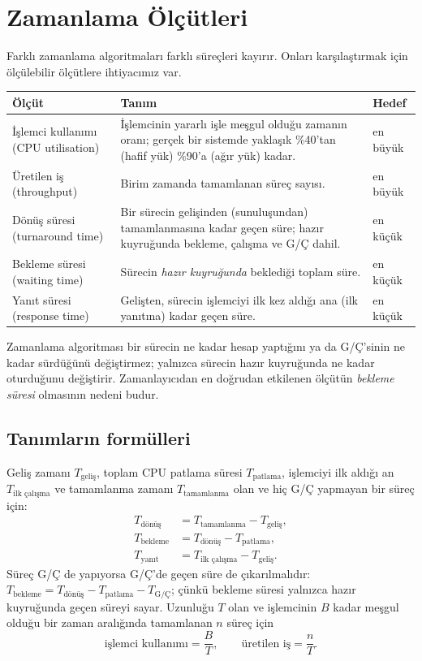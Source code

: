 \documentclass[11pt,a4paper]{article}
\begin{document}
\section{Zamanlama Ölçütleri}

Farklı zamanlama algoritmaları farklı süreçleri kayırır. Onları karşılaştırmak için ölçülebilir ölçütlere ihtiyacımız var.

\begin{center}
\renewcommand{\arraystretch}{1.3}
\begin{tabularx}{\linewidth}{>{\raggedright\arraybackslash}p{3.3cm} X l}
\toprule
\textbf{Ölçüt} & \textbf{Tanım} & \textbf{Hedef} \\
\midrule
İşlemci kullanımı (CPU utilisation) & İşlemcinin yararlı işle meşgul olduğu zamanın oranı; gerçek bir sistemde yaklaşık \%40'tan (hafif yük) \%90'a (ağır yük) kadar. & en büyük \\
Üretilen iş (throughput) & Birim zamanda tamamlanan süreç sayısı. & en büyük \\
Dönüş süresi (turnaround time) & Bir sürecin gelişinden (sunuluşundan) tamamlanmasına kadar geçen süre; hazır kuyruğunda bekleme, çalışma ve G/Ç dahil. & en küçük \\
Bekleme süresi (waiting time) & Sürecin \emph{hazır kuyruğunda} beklediği toplam süre. & en küçük \\
Yanıt süresi (response time) & Gelişten, sürecin işlemciyi ilk kez aldığı ana (ilk yanıtına) kadar geçen süre. & en küçük \\
\bottomrule
\end{tabularx}
\end{center}

Zamanlama algoritması bir sürecin ne kadar hesap yaptığını ya da G/Ç'sinin ne kadar sürdüğünü değiştirmez; yalnızca sürecin hazır kuyruğunda ne kadar oturduğunu değiştirir. Zamanlayıcıdan en doğrudan etkilenen ölçütün \emph{bekleme süresi} olmasının nedeni budur.

\subsection{Tanımların formülleri}

Geliş zamanı $T_{\text{geliş}}$, toplam CPU patlama süresi $T_{\text{patlama}}$, işlemciyi ilk aldığı an $T_{\text{ilk çalışma}}$ ve tamamlanma zamanı $T_{\text{tamamlanma}}$ olan ve hiç G/Ç yapmayan bir süreç için:
\begin{align*}
T_{\text{dönüş}} &= T_{\text{tamamlanma}} - T_{\text{geliş}},\\
T_{\text{bekleme}} &= T_{\text{dönüş}} - T_{\text{patlama}},\\
T_{\text{yanıt}} &= T_{\text{ilk çalışma}} - T_{\text{geliş}}.
\end{align*}
Süreç G/Ç de yapıyorsa G/Ç'de geçen süre de çıkarılmalıdır: $T_{\text{bekleme}} = T_{\text{dönüş}} - T_{\text{patlama}} - T_{\text{G/Ç}}$; çünkü bekleme süresi yalnızca hazır kuyruğunda geçen süreyi sayar. Uzunluğu $T$ olan ve işlemcinin $B$ kadar meşgul olduğu bir zaman aralığında tamamlanan $n$ süreç için
\[
\text{işlemci kullanımı} = \frac{B}{T}, \qquad \text{üretilen iş} = \frac{n}{T}.
\]
\end{document}
